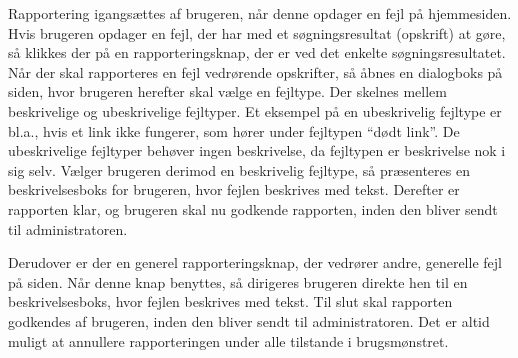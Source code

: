 {Rapportering igangsættes af brugeren, når denne opdager en fejl på hjemmesiden. Hvis brugeren opdager en fejl, der har med et søgningsresultat (opskrift) at gøre, så klikkes der på en rapporteringsknap, der er ved det enkelte søgningsresultatet. Når der skal rapporteres en fejl vedrørende opskrifter, så åbnes en dialogboks på siden, hvor brugeren herefter skal vælge en fejltype. Der skelnes mellem beskrivelige og ubeskrivelige fejltyper. Et eksempel på en ubeskrivelig fejltype er bl.a., hvis et link ikke fungerer, som hører under fejltypen “dødt link”. De ubeskrivelige fejltyper behøver ingen beskrivelse, da fejltypen er beskrivelse nok i sig selv. Vælger brugeren derimod en beskrivelig fejltype, så præsenteres en beskrivelsesboks for brugeren, hvor fejlen beskrives med tekst. Derefter er rapporten klar, og brugeren skal nu godkende rapporten, inden den bliver sendt til administratoren.

Derudover er der en generel rapporteringsknap, der vedrører andre, generelle fejl på siden. Når denne knap benyttes, så dirigeres brugeren direkte hen til en beskrivelsesboks, hvor fejlen beskrives med tekst. Til slut skal rapporten godkendes af brugeren, inden den bliver sendt til administratoren. Det er altid muligt at annullere rapporteringen under alle tilstande i brugsmønstret.}
{}
{}
